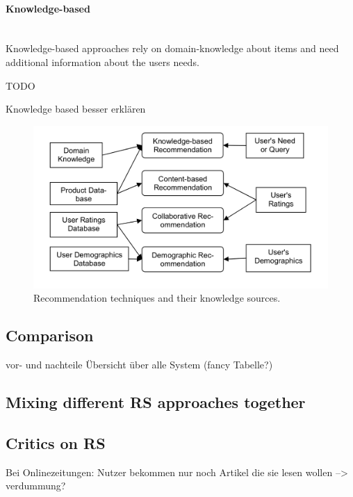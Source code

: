 \paragraph{Knowledge-based}~\\
Knowledge-based approaches rely on domain-knowledge about items and need additional information about the users needs.
\citep[p.~12-13]{ricci:2011}

TODO

Knowledge based besser erkl\"aren

\begin{figure}[h]
    \center
    \includegraphics[scale=0.3]{inc/recommendersystems/RecommendationTechniquesAndKnowledgeSources.png}
    \caption{Recommendation techniques and their knowledge sources.\citep[p.~379]{burke:2007}}
\end{figure}

\subsection{Comparison}
vor- und nachteile
\"Ubersicht \"uber alle System (fancy Tabelle?)

\subsection{Mixing different RS approaches together}

\subsection{Critics on RS}
Bei Onlinezeitungen: Nutzer bekommen nur noch Artikel die sie lesen wollen --> verdummung?
